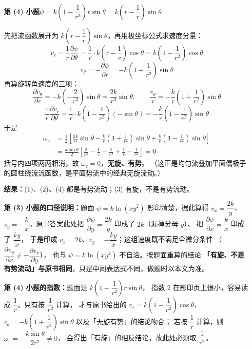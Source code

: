 \begin{jie}
\textbf{第 (4) 小题\quad $\psi=k\left(1-\dfrac{1}{r^2}\right)r\sin\theta=k\left(r-\dfrac{1}{r}\right)\sin\theta$}

先把流函数展开为 $k\!\left(r-\dfrac{1}{r}\right)\sin\theta$，再用极坐标公式求速度分量：
\[ v_r=\frac{1}{r}\frac{\partial\psi}{\partial\theta}
 =\frac{1}{r}\cdot k\left(r-\frac{1}{r}\right)\cos\theta
 =k\left(1-\frac{1}{r^2}\right)\cos\theta \]
\[ v_\theta=-\frac{\partial\psi}{\partial r}
 =-k\left(1+\frac{1}{r^2}\right)\sin\theta \]
再算旋转角速度的三项：
\[ \frac{\partial v_\theta}{\partial r}=-k\left(-\frac{2}{r^3}\right)\sin\theta=\frac{2k}{r^3}\sin\theta,\qquad
   \frac{v_\theta}{r}=-\frac{k}{r}\left(1+\frac{1}{r^2}\right)\sin\theta \]
\[ \frac{1}{r}\frac{\partial v_r}{\partial\theta}
 =\frac{1}{r}\cdot k\left(1-\frac{1}{r^2}\right)(-\sin\theta)
 =-\frac{k}{r}\left(1-\frac{1}{r^2}\right)\sin\theta \]
于是
\[ \begin{aligned}
\omega_z&=\frac{1}{2}\left[\frac{2k}{r^3}\sin\theta
 -\frac{k}{r}\left(1+\frac{1}{r^2}\right)\sin\theta
 +\frac{k}{r}\left(1-\frac{1}{r^2}\right)\sin\theta\right]\\
&=\frac{k\sin\theta}{2}\left[\frac{2}{r^3}-\frac{1}{r}-\frac{1}{r^3}+\frac{1}{r}-\frac{1}{r^3}\right]=0
\end{aligned} \]
括号内四项两两相消，故 $\omega_z=0$，\textbf{无旋、有势}。
（这正是均匀流叠加平面偶极子的圆柱绕流流函数，是平面势流中的经典无旋流动。）

\textbf{结果：}(1)、(2)、(4) 都是有势流动；(3) 有旋，不是有势流动。
\end{jie}

\begin{tishi}
\textbf{第 (3) 小题的口径说明：}题面 $\psi=k\ln(xy^2)$ 影印清楚，据此算得
$v_x=\dfrac{2k}{y}$、$v_y=-\dfrac{k}{x}$。原书答案此处把
$\dfrac{\partial\psi}{\partial y}=\dfrac{2k}{y}$ 印成了 $2k$（漏掉分母 $y$）、
把 $\dfrac{\partial\psi}{\partial x}=\dfrac{k}{x}$ 印成了 $\dfrac{ky}{x}$，
于是印成 $v_x=2k$、$v_y=-\dfrac{ky}{x}$；这组速度既不满足全微分条件
（$\dfrac{\partial v_y}{\partial x}\neq-\dfrac{\partial v_x}{\partial y}$），
也与 $\psi=k\ln(xy^2)$ 不自洽。按题面重算的结论
\textbf{「有旋、不是有势流动」与原书相同}，只是中间表达式不同，做题时以本文为准。

\textbf{第 (4) 小题的指数：}题面是 $k\left(1-\dfrac{1}{r^2}\right)r\sin\theta$，
指数 $2$ 在影印页上很小，容易读成 $\dfrac{1}{r}$。只有按 $\dfrac{1}{r^2}$ 计算，
才与原书给出的 $v_r=k\left(1-\dfrac{1}{r^2}\right)\cos\theta$、
$v_\theta=-k\left(1+\dfrac{1}{r^2}\right)\sin\theta$ 以及「无旋有势」的结论吻合；
若按 $\dfrac{1}{r}$ 计算，则 $\omega_z=-\dfrac{k\sin\theta}{2r^2}\neq0$，
会得出「有旋」的相反结论，故此处必须取 $\dfrac{1}{r^2}$。
\end{tishi}

